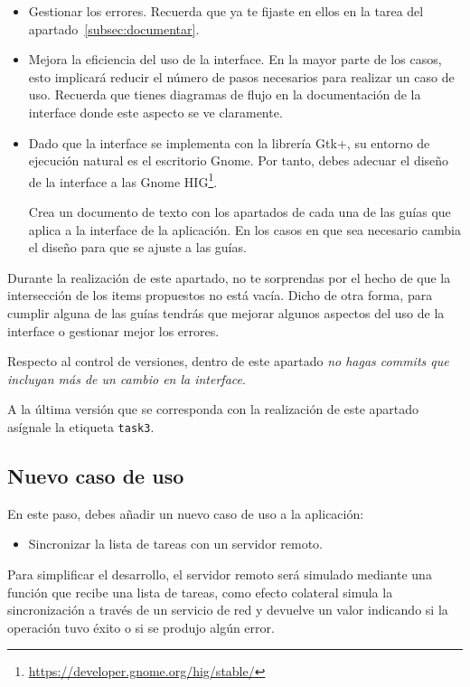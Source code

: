 \documentclass[11pt,a4paper]{article}
\begin{document}
\begin{itemize}
\item Gestionar los errores. Recuerda que ya te fijaste en ellos en la
  tarea del apartado~\ref{subsec:documentar}.

\item Mejora la eficiencia del uso de la interface. En la mayor parte
  de los casos, esto implicará reducir el número de pasos necesarios
  para realizar un caso de uso. Recuerda que tienes diagramas de
  flujo en la documentación de la interface donde este aspecto se ve
  claramente.

\item Dado que la interface se implementa con la librería Gtk+, su
  entorno de ejecución natural es el escritorio Gnome. Por tanto,
  debes adecuar el diseño de la interface a las Gnome
  HIG\footnote{\url{https://developer.gnome.org/hig/stable/}}.

  Crea un documento de texto con los apartados de cada una de las
  guías que aplica a la interface de la aplicación. En los casos en
  que sea necesario cambia el diseño para que se ajuste a las guías.
\end{itemize}

Durante la realización de este apartado, no te sorprendas por el hecho
de que la intersección de los items propuestos no está vacía. Dicho de
otra forma, para cumplir alguna de las guías tendrás que mejorar
algunos aspectos del uso de la interface o gestionar mejor los
errores.

Respecto al control de versiones, dentro de este apartado \emph{no
  hagas commits que incluyan más de un cambio en la interface}.

A la última versión que se corresponda con la realización de este
apartado asígnale la etiqueta \texttt{task3}.

\subsection{Nuevo caso de uso}

En este paso, debes añadir un nuevo caso de uso a la aplicación:

\begin{itemize}
\item Sincronizar la lista de tareas con un servidor remoto.
\end{itemize}

Para simplificar el desarrollo, el servidor remoto será simulado
mediante una función que recibe una lista de tareas, como efecto
colateral simula la sincronización a través de un servicio de red y
devuelve un valor indicando si la operación tuvo éxito o si se produjo
algún error.
\end{document}
